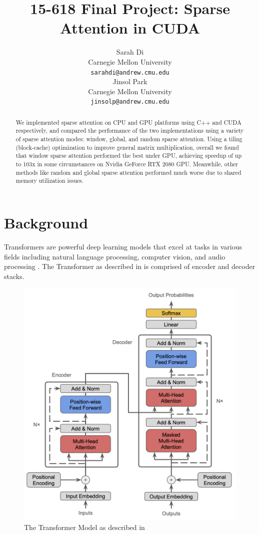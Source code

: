 \documentclass[11pt]{article}
\title{15-618 Final Project: Sparse Attention in CUDA}
\author{Sarah Di \\
  Carnegie Mellon University\\
  \texttt{sarahdi@andrew.cmu.edu} \\\And
  Jinsol Park \\
  Carnegie Mellon University\\
  \texttt{jinsolp@andrew.cmu.edu} \\}
\begin{document}
\maketitle
\begin{abstract}
We implemented sparse attention on CPU and GPU platforms using C++ and CUDA respectively, and compared the performance of the two implementations using a variety of sparse attention modes: window, global, and random sparse attention. Using a tiling (block-cache) optimization to improve general matrix multiplication, overall we found that window sparse attention performed the best under GPU, achieving speedup of up to 103x in some circumstances on Nvidia GeForce RTX 2080 GPU. Meanwhile, other methods like random and global sparse attention performed much worse due to shared memory utilization issues. 


\end{abstract}

\section{Background}
Transformers are powerful deep learning models that excel at tasks in various fields including natural language processing, computer vision, and audio processing \cite{lin2022survey}. 
The Transformer as described in \citet{vaswani2017attention} is comprised of encoder and decoder stacks. 

\begin{figure}[ht]
  \centering
  \includegraphics[width=\linewidth]{figures/transformer.png}
  \caption{The Transformer Model as described in \citet{vaswani2017attention}}
 \label{fig:transformer}
\end{figure}
\end{document}
